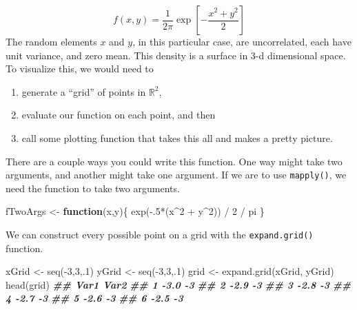 \documentclass[
  12pt,
  krantz2]{krantz}
\makeatletter
\newenvironment{Shaded}{\begin{snugshade}}{\end{snugshade}}
\newcommand{\ControlFlowTok}[1]{\textcolor[rgb]{0.27,0.27,0.27}{\textbf{#1}}}
\newcommand{\DecValTok}[1]{\textcolor[rgb]{0.06,0.06,0.06}{#1}}
\newcommand{\DocumentationTok}[1]{\textcolor[rgb]{0.37,0.37,0.37}{\textbf{\textit{#1}}}}
\newcommand{\FunctionTok}[1]{\textcolor[rgb]{0,0,0}{#1}}
\newcommand{\NormalTok}[1]{#1}
\newcommand{\OtherTok}[1]{\textcolor[rgb]{0.37,0.37,0.37}{#1}}
\newcommand{\SpecialCharTok}[1]{\textcolor[rgb]{0,0,0}{#1}}
\providecommand{\tightlist}{%
  \setlength{\itemsep}{0pt}\setlength{\parskip}{0pt}}
\newenvironment{kframe}{%
\medskip{}
\setlength{\fboxsep}{.8em}
 \def\at@end@of@kframe{}%
 \ifinner\ifhmode%
  \def\at@end@of@kframe{\end{minipage}}%
  \begin{minipage}{\columnwidth}%
 \fi\fi%
 \def\FrameCommand##1{\hskip\@totalleftmargin \hskip-\fboxsep
 \colorbox{shadecolor}{##1}\hskip-\fboxsep
     \hskip-\linewidth \hskip-\@totalleftmargin \hskip\columnwidth}%
 \MakeFramed {\advance\hsize-\width
   \@totalleftmargin\z@ \linewidth\hsize
   \@setminipage}}%
 {\par\unskip\endMakeFramed%
 \at@end@of@kframe}
\renewenvironment{Shaded}{\begin{kframe}}{\end{kframe}}
\makeatother
\begin{document}
\[
f(x,y) = \frac{1}{2 \pi}  \exp\left[ -\frac{x ^2 + y^2}{2}     \right]
\]
The random elements \(x\) and \(y\), in this particular case, are uncorrelated, each have unit variance, and zero mean. This density is a surface in 3-d dimensional space. To visualize this, we would need to

\begin{enumerate}
\def\labelenumi{\arabic{enumi}.}
\tightlist
\item
  generate a ``grid'' of points in \(\mathbb{R}^2\),
\item
  evaluate our function on each point, and then
\item
  call some plotting function that takes this all and makes a pretty picture.
\end{enumerate}

There are a couple ways you could write this function. One way might take two arguments, and another might take one argument. If we are to use \texttt{mapply()}, we need the function to take two arguments.

\begin{Shaded}
\begin{Highlighting}[]
\NormalTok{fTwoArgs }\OtherTok{\textless{}{-}} \ControlFlowTok{function}\NormalTok{(x,y)\{}
  \FunctionTok{exp}\NormalTok{(}\SpecialCharTok{{-}}\NormalTok{.}\DecValTok{5}\SpecialCharTok{*}\NormalTok{(x}\SpecialCharTok{\^{}}\DecValTok{2} \SpecialCharTok{+}\NormalTok{ y}\SpecialCharTok{\^{}}\DecValTok{2}\NormalTok{)) }\SpecialCharTok{/} \DecValTok{2} \SpecialCharTok{/}\NormalTok{ pi}
\NormalTok{\}}
\end{Highlighting}
\end{Shaded}

We can construct every possible point on a grid with the \texttt{expand.grid()} function.

\begin{Shaded}
\begin{Highlighting}[]
\NormalTok{xGrid }\OtherTok{\textless{}{-}} \FunctionTok{seq}\NormalTok{(}\SpecialCharTok{{-}}\DecValTok{3}\NormalTok{,}\DecValTok{3}\NormalTok{,.}\DecValTok{1}\NormalTok{)}
\NormalTok{yGrid }\OtherTok{\textless{}{-}} \FunctionTok{seq}\NormalTok{(}\SpecialCharTok{{-}}\DecValTok{3}\NormalTok{,}\DecValTok{3}\NormalTok{,.}\DecValTok{1}\NormalTok{)}
\NormalTok{grid }\OtherTok{\textless{}{-}} \FunctionTok{expand.grid}\NormalTok{(xGrid, yGrid)}
\FunctionTok{head}\NormalTok{(grid)}
\DocumentationTok{\#\#   Var1 Var2}
\DocumentationTok{\#\# 1 {-}3.0   {-}3}
\DocumentationTok{\#\# 2 {-}2.9   {-}3}
\DocumentationTok{\#\# 3 {-}2.8   {-}3}
\DocumentationTok{\#\# 4 {-}2.7   {-}3}
\DocumentationTok{\#\# 5 {-}2.6   {-}3}
\DocumentationTok{\#\# 6 {-}2.5   {-}3}
\end{Highlighting}
\end{Shaded}
\end{document}
